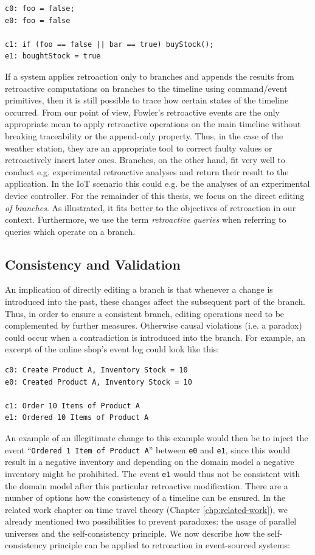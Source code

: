 \begin{lstlisting}[style=styled]
c0: foo = false;
e0: foo = false

c1: if (foo == false || bar == true) buyStock();
e1: boughtStock = true
\end{lstlisting}

If a system applies retroaction only to branches and appends the results from
retroactive computations on branches to the timeline using command/event 
primitives, then it is still possible to trace how certain states of the 
timeline occurred. From our point of view, Fowler's retroactive events are the 
only appropriate mean to apply retroactive operations on the main timeline 
without breaking traceability or the append-only property. Thus, in the case 
of the weather station, they are an appropriate tool to correct faulty values
or retroactively insert later ones.
Branches, on the other hand, fit very well to conduct e.g. experimental 
retroactive analyses and return their result to the application. In the IoT 
scenario this could e.g. be the analyses of an experimental device controller.
For the remainder of this thesis, we focus on the direct editing \emph{of branches}. 
As illustrated, it fits better to the objectives of retroaction in our context. 
Furthermore, we use the term \emph{retroactive queries} when referring to queries
which operate on a branch.

\subsection{Consistency and Validation}
\label{sec:validation}
An implication of directly editing a branch is that whenever a change is 
introduced into the past, these changes affect the subsequent part of the 
branch. Thus, in order to ensure a consistent branch, editing operations 
need to be complemented by further measures.
Otherwise causal violations (i.e. a paradox) could occur when a contradiction 
is introduced into the branch. For example, an excerpt of the online shop's 
event log could look like this:

\begin{lstlisting}[style=styled]
c0: Create Product A, Inventory Stock = 10
e0: Created Product A, Inventory Stock = 10

c1: Order 10 Items of Product A
e1: Ordered 10 Items of Product A
\end{lstlisting}

An example of an illegitimate change to this example would then be to inject 
the event ``\texttt{Ordered 1 Item of Product A}'' between \texttt{e0} and 
\texttt{e1}, since this would result in a negative inventory and depending 
on the domain model a negative inventory might be prohibited. The event 
\texttt{e1} would thus not be consistent with the domain model after this 
particular retroactive modification.
There are a number of options how the consistency of a timeline can be ensured.
In the related work chapter on time travel theory (Chapter \ref{chp:related-work}), 
we already mentioned two possibilities to prevent paradoxes: the usage of 
parallel universes and the self-consistency principle. We now describe how the 
self-consistency principle can be applied to retroaction in event-sourced systems:

